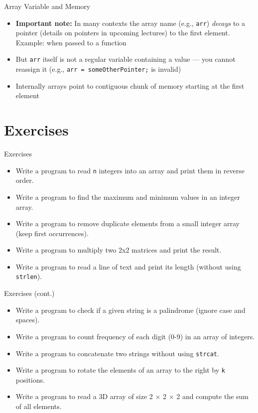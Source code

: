 \documentclass[12pt, aspectratio=169]{beamer}
\begin{document}
    \begin{frame}{Array Variable and Memory}
        \begin{itemize}
            \item \textbf{Important note:} In many contexts the array name (e.g., \texttt{arr}) \emph{decays} to a pointer (details on pointers in upcoming lectures) to the first element. Example: when passed to a function
            \item But \texttt{arr} itself is not a regular variable containing a value — you cannot reassign it (e.g., \texttt{arr = someOtherPointer;} is invalid)
            \item Internally arrays point to contiguous chunk of memory starting at the first element
        \end{itemize}
    \end{frame}



    \section{Exercises}


    \begin{frame}{Exercises}
        \begin{itemize}
            \item Write a program to read \texttt{n} integers into an array and print them in reverse order.
            \item Write a program to find the maximum and minimum values in an integer array.
            \item Write a program to remove duplicate elements from a small integer array (keep first occurrences).
            \item Write a program to multiply two 2x2 matrices and print the result.
            \item Write a program to read a line of text and print its length (without using \texttt{strlen}).
        \end{itemize}
    \end{frame}


    \begin{frame}{Exercises (cont.)}
        \begin{itemize}
            \item Write a program to check if a given string is a palindrome (ignore case and spaces).
            \item Write a program to count frequency of each digit (0-9) in an array of integers.
            \item Write a program to concatenate two strings without using \texttt{strcat}.
            \item Write a program to rotate the elements of an array to the right by \texttt{k} positions.
            \item Write a program to read a 3D array of size 2 × 2 × 2 and compute the sum of all elements.
        \end{itemize}
    \end{frame}
\end{document}
